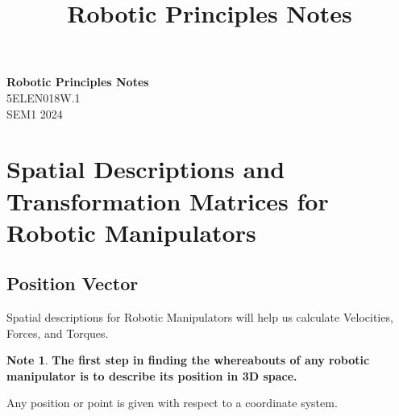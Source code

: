 \documentclass[11pt]{article}
\theoremstyle{definition}
\newtheorem{note}{Note}
\begin{document}
\setcounter{section}{0}

\title{Robotic Principles Notes}

\thispagestyle{empty}

\begin{center}
{\LARGE \bf Robotic Principles Notes}\\
{\large 5ELEN018W.1}\\
SEM1 2024
\end{center}

\section{Spatial Descriptions and Transformation Matrices for Robotic Manipulators}
\subsection{Position Vector}
Spatial descriptions for Robotic Manipulators will help us calculate Velocities, Forces, and Torques.

\begin{note}
\textbf{The first step in finding the whereabouts of any robotic manipulator is to describe its position in 3D space.}
\end{note}

Any position or point is given with respect to a coordinate system. 
\end{document}
